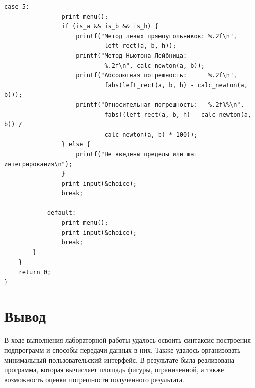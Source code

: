 \documentclass[a4paper,14pt]{extarticle}
\begin{document}
\begin{Verbatim}[tabsize=2]
			case 5:
				print_menu();
				if (is_a && is_b && is_h) {
					printf("Метод левых прямоугольников: %.2f\n", 
							left_rect(a, b, h));
					printf("Метод Ньютона-Лейбница:      
							%.2f\n", calc_newton(a, b));
					printf("Абсолютная погрешность:      %.2f\n", 
							fabs(left_rect(a, b, h) - calc_newton(a, b)));
					printf("Относительная погрешность:   %.2f%%\n",
							fabs((left_rect(a, b, h) - calc_newton(a, b)) /
							calc_newton(a, b) * 100));
				} else {
					printf("Не введены пределы или шаг интегрирования\n");
				}
				print_input(&choice);
				break;
			
			default:
				print_menu();
				print_input(&choice);
				break;
		}
	}
	return 0;
}
	\end{Verbatim}
	
	\section*{Вывод}
	В ходе выполнения лабораторной работы удалось освоить синтаксис построения подпрограмм и способы передачи данных в них. Также удалось организовать минимальный пользовательский интерфейс. В результате была реализована программа, которая вычисляет площадь фигуры, ограниченной, а также возможность оценки погрешности полученного результата. 
	
\end{document}
